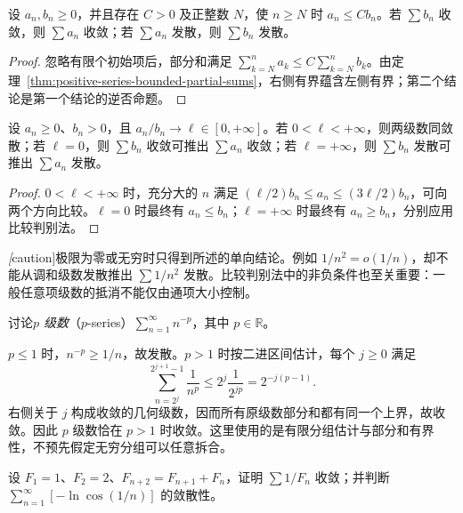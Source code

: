 \documentclass[UTF8,12pt,a4paper,fontset=fandol]{ctexbook}
\begin{document}
\begin{theorem}[比较判别法]
\label{thm:series-comparison-test}
设 $a_n,b_n\geq0$，并且存在 $C>0$ 及正整数 $N$，使 $n\geq N$ 时 $a_n\leq Cb_n$。若 $\sum b_n$ 收敛，则 $\sum a_n$ 收敛；若 $\sum a_n$ 发散，则 $\sum b_n$ 发散。
\end{theorem}

\begin{proof}
忽略有限个初始项后，部分和满足 $\sum_{k=N}^n a_k\leq C\sum_{k=N}^n b_k$。由定理~\ref{thm:positive-series-bounded-partial-sums}，右侧有界蕴含左侧有界；第二个结论是第一个结论的逆否命题。
\end{proof}

\begin{corollary}[极限比较判别法]
\label{cor:series-limit-comparison-test}
设 $a_n\geq0$、$b_n>0$，且 $a_n/b_n\to\ell\in[0,+\infty]$。若 $0<\ell<+\infty$，则两级数同敛散；若 $\ell=0$，则 $\sum b_n$ 收敛可推出 $\sum a_n$ 收敛；若 $\ell=+\infty$，则 $\sum b_n$ 发散可推出 $\sum a_n$ 发散。
\end{corollary}

\begin{proof}
$0<\ell<+\infty$ 时，充分大的 $n$ 满足 $(\ell/2)b_n\leq a_n\leq(3\ell/2)b_n$，可向两个方向比较。$\ell=0$ 时最终有 $a_n\leq b_n$；$\ell=+\infty$ 时最终有 $a_n\geq b_n$，分别应用比较判别法。
\end{proof}

\emph[caution]{极限为零或无穷时只得到所述的单向结论。}例如 $1/n^2=o(1/n)$，却不能从调和级数发散推出 $\sum1/n^2$ 发散。比较判别法中的非负条件也至关重要：一般任意项级数的抵消不能仅由通项大小控制。

\begin{example}
\label{ex:p-series-convergence}
讨论\emph{$p$ 级数}（$p$-series）$\sum_{n=1}^{\infty}n^{-p}$，其中 $p\in\mathbb R$。
\end{example}

\begin{solve}
$p\leq1$ 时，$n^{-p}\geq1/n$，故发散。$p>1$ 时按二进区间估计，每个 $j\geq0$ 满足
\[
    \sum_{n=2^j}^{2^{j+1}-1}\frac1{n^p}
    \leq 2^j\frac1{2^{jp}}=2^{-j(p-1)}.
\]
右侧关于 $j$ 构成收敛的几何级数，因而所有原级数部分和都有同一个上界，故收敛。因此 $p$ 级数恰在 $p>1$ 时收敛。这里使用的是有限分组估计与部分和有界性，不预先假定无穷分组可以任意拆合。
\end{solve}

\begin{example}
\label{ex:comparison-series-fibonacci-and-logcos}
设 $F_1=1$、$F_2=2$、$F_{n+2}=F_{n+1}+F_n$，证明 $\sum1/F_n$ 收敛；并判断 $\sum_{n=1}^{\infty}[-\ln\cos(1/n)]$ 的敛散性。
\end{example}
\end{document}
